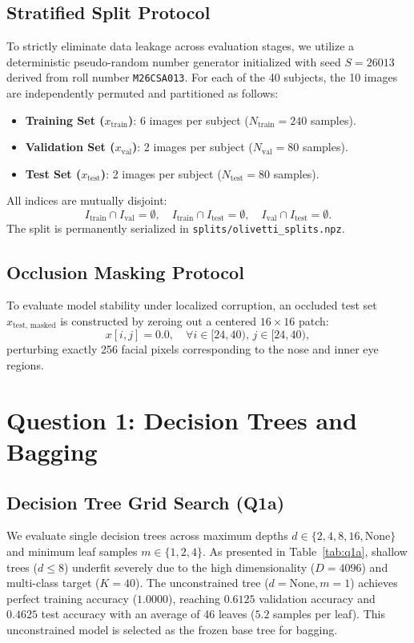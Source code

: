 \documentclass[10pt,twocolumn,letterpaper]{article}
\begin{document}
\subsection{Stratified Split Protocol}
To strictly eliminate data leakage across evaluation stages, we utilize a deterministic pseudo-random number generator initialized with seed $S = 26013$ derived from roll number \texttt{M26CSA013}. For each of the 40 subjects, the 10 images are independently permuted and partitioned as follows:
\begin{itemize}
    \item \textbf{Training Set ($x_{\text{train}}$)}: 6 images per subject ($N_{\text{train}} = 240$ samples).
    \item \textbf{Validation Set ($x_{\text{val}}$)}: 2 images per subject ($N_{\text{val}} = 80$ samples).
    \item \textbf{Test Set ($x_{\text{test}}$)}: 2 images per subject ($N_{\text{test}} = 80$ samples).
\end{itemize}
All indices are mutually disjoint:
\begin{equation}
    I_{\text{train}} \cap I_{\text{val}} = \emptyset, \quad I_{\text{train}} \cap I_{\text{test}} = \emptyset, \quad I_{\text{val}} \cap I_{\text{test}} = \emptyset.
\end{equation}
The split is permanently serialized in \texttt{splits/olivetti\_splits.npz}.

\subsection{Occlusion Masking Protocol}
To evaluate model stability under localized corruption, an occluded test set $x_{\text{test, masked}}$ is constructed by zeroing out a centered $16 \times 16$ patch:
\begin{equation}
    x[i, j] = 0.0, \quad \forall i \in [24, 40), \, j \in [24, 40),
\end{equation}
perturbing exactly 256 facial pixels corresponding to the nose and inner eye regions.

\section{Question 1: Decision Trees and Bagging}
\label{sec:q1}

\subsection{Decision Tree Grid Search (Q1a)}
We evaluate single decision trees across maximum depths $d \in \{2, 4, 8, 16, \text{None}\}$ and minimum leaf samples $m \in \{1, 2, 4\}$. As presented in Table~\ref{tab:q1a}, shallow trees ($d \le 8$) underfit severely due to the high dimensionality ($D=4096$) and multi-class target ($K=40$). The unconstrained tree ($d=\text{None}, m=1$) achieves perfect training accuracy ($1.0000$), reaching $0.6125$ validation accuracy and $0.4625$ test accuracy with an average of 46 leaves ($5.2$ samples per leaf). This unconstrained model is selected as the frozen base tree for bagging.
\end{document}
